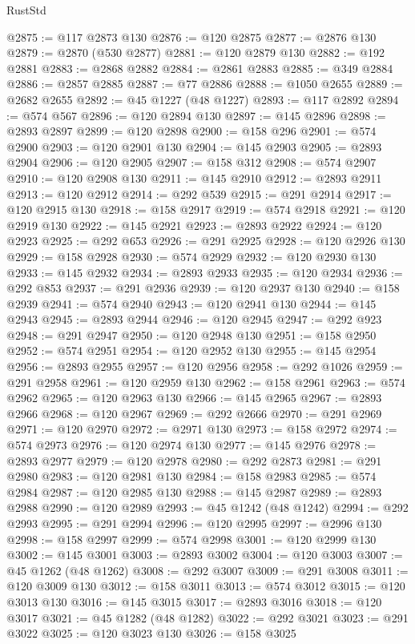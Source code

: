 \begin{lexlean}{RustStd}
\begin{coremodule}
@2875 := @117 @2873 @130
@2876 := @120 @2875
@2877 := @2876 @130
@2879 := @2870 (@530 @2877)
@2881 := @120 @2879 @130
@2882 := @192 @2881
@2883 := @2868 @2882
@2884 := @2861 @2883
@2885 := @349 @2884
@2886 := @2857 @2885
@2887 := @77 @2886
@2888 := @1050 @2655
@2889 := @2682 @2655
@2892 := @45 @1227 (@48 @1227)
@2893 := @117 @2892
@2894 := @574 @567
@2896 := @120 @2894 @130
@2897 := @145 @2896
@2898 := @2893 @2897
@2899 := @120 @2898
@2900 := @158 @296
@2901 := @574 @2900
@2903 := @120 @2901 @130
@2904 := @145 @2903
@2905 := @2893 @2904
@2906 := @120 @2905
@2907 := @158 @312
@2908 := @574 @2907
@2910 := @120 @2908 @130
@2911 := @145 @2910
@2912 := @2893 @2911
@2913 := @120 @2912
@2914 := @292 @539
@2915 := @291 @2914
@2917 := @120 @2915 @130
@2918 := @158 @2917
@2919 := @574 @2918
@2921 := @120 @2919 @130
@2922 := @145 @2921
@2923 := @2893 @2922
@2924 := @120 @2923
@2925 := @292 @653
@2926 := @291 @2925
@2928 := @120 @2926 @130
@2929 := @158 @2928
@2930 := @574 @2929
@2932 := @120 @2930 @130
@2933 := @145 @2932
@2934 := @2893 @2933
@2935 := @120 @2934
@2936 := @292 @853
@2937 := @291 @2936
@2939 := @120 @2937 @130
@2940 := @158 @2939
@2941 := @574 @2940
@2943 := @120 @2941 @130
@2944 := @145 @2943
@2945 := @2893 @2944
@2946 := @120 @2945
@2947 := @292 @923
@2948 := @291 @2947
@2950 := @120 @2948 @130
@2951 := @158 @2950
@2952 := @574 @2951
@2954 := @120 @2952 @130
@2955 := @145 @2954
@2956 := @2893 @2955
@2957 := @120 @2956
@2958 := @292 @1026
@2959 := @291 @2958
@2961 := @120 @2959 @130
@2962 := @158 @2961
@2963 := @574 @2962
@2965 := @120 @2963 @130
@2966 := @145 @2965
@2967 := @2893 @2966
@2968 := @120 @2967
@2969 := @292 @2666
@2970 := @291 @2969
@2971 := @120 @2970
@2972 := @2971 @130
@2973 := @158 @2972
@2974 := @574 @2973
@2976 := @120 @2974 @130
@2977 := @145 @2976
@2978 := @2893 @2977
@2979 := @120 @2978
@2980 := @292 @2873
@2981 := @291 @2980
@2983 := @120 @2981 @130
@2984 := @158 @2983
@2985 := @574 @2984
@2987 := @120 @2985 @130
@2988 := @145 @2987
@2989 := @2893 @2988
@2990 := @120 @2989
@2993 := @45 @1242 (@48 @1242)
@2994 := @292 @2993
@2995 := @291 @2994
@2996 := @120 @2995
@2997 := @2996 @130
@2998 := @158 @2997
@2999 := @574 @2998
@3001 := @120 @2999 @130
@3002 := @145 @3001
@3003 := @2893 @3002
@3004 := @120 @3003
@3007 := @45 @1262 (@48 @1262)
@3008 := @292 @3007
@3009 := @291 @3008
@3011 := @120 @3009 @130
@3012 := @158 @3011
@3013 := @574 @3012
@3015 := @120 @3013 @130
@3016 := @145 @3015
@3017 := @2893 @3016
@3018 := @120 @3017
@3021 := @45 @1282 (@48 @1282)
@3022 := @292 @3021
@3023 := @291 @3022
@3025 := @120 @3023 @130
@3026 := @158 @3025

\end{coremodule}
\end{lexlean}
